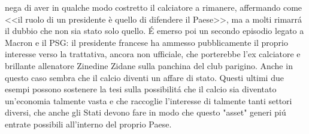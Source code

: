 \documentclass[
    corpo=12pt,
    oneside,
    evenboxes,
    tipotesi=triennale,
    stile=classica,
    oldstyle,
    autoretitolo,
    greek,
]{toptesi}
\begin{document}
\begin{interlinea}{1.5}
nega di aver in qualche modo costretto il calciatore a rimanere, affermando come <<il ruolo di un presidente è quello di difendere il Paese>>, ma 
a molti rimarr\'a il dubbio che non sia stato solo quello. \'E emerso poi un secondo episodio legato a Macron e il PSG: il presidente francese ha ammesso pubblicamente
il proprio interesse verso la trattativa, ancora non ufficiale, che porterebbe l'ex calciatore e brillante allenatore Zinedine Zidane sulla 
panchina del club parigino. Anche in questo caso sembra che il calcio diventi un affare di stato.\newline
Questi ultimi due esempi possono sostenere la tesi sulla possibilit\'a che il calcio sia diventato un'economia talmente vasta e che raccoglie
l'interesse di talmente tanti settori diversi, che anche gli Stati devono fare in modo che questo "asset" generi pi\'u entrate possibili all'interno
del proprio Paese.

\end{interlinea}
\end{document}
